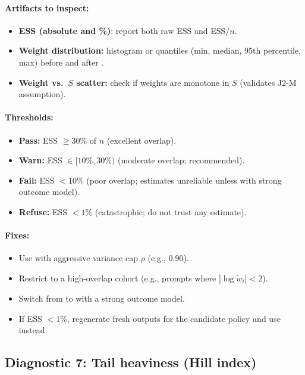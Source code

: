 \paragraph{Artifacts to inspect:}
\begin{itemize}
\item \textbf{ESS (absolute and \%)}: report both raw ESS and ESS$/n$.
\item \textbf{Weight distribution:} histogram or quantiles (min, median, 95th percentile, max) before and after \simcal.
\item \textbf{Weight vs.\ $S$ scatter:} check if weights are monotone in $S$ (validates J2-M assumption).
\end{itemize}

\paragraph{Thresholds:}
\begin{itemize}
\item \textbf{Pass:} ESS $\ge 30\%$ of $n$ (excellent overlap).
\item \textbf{Warn:} ESS $\in [10\%, 30\%)$ (moderate overlap; \dr{} recommended).
\item \textbf{Fail:} ESS $< 10\%$ (poor overlap; estimates unreliable unless \dr{} with strong outcome model).
\item \textbf{Refuse:} ESS $< 1\%$ (catastrophic; do not trust any estimate).
\end{itemize}

\paragraph{Fixes:}
\begin{itemize}
\item Use \simcal{} with aggressive variance cap $\rho$ (e.g., 0.90).
\item Restrict to a high-overlap cohort (e.g., prompts where $|\log \tilde{w}_i| < 2$).
\item Switch from \ips{} to \dr{} with a strong outcome model.
\item If ESS $< 1\%$, regenerate fresh outputs for the candidate policy and use \dm{} instead.
\end{itemize}

\subsection{Diagnostic 7: Tail heaviness (Hill index)}

